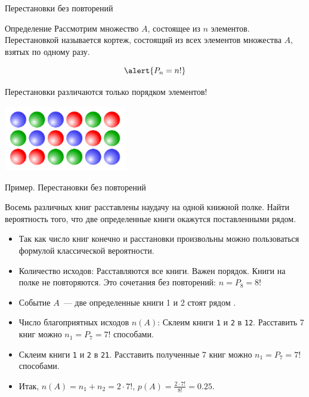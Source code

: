 \documentclass[unicode,11pt,notheorems,xcolor=table]{beamer}
\begin{document}
\begin{frame}{Перестановки без повторений} 

    \begin{block}{Определение}
        Рассмотрим множество $A$, состоящее из $n$ элементов.
        \alert{Перестановкой} называется кортеж, состоящий из всех элементов  множества $A$, взятых по одному разу.
    \end{block}
    $$
        \alert{P_n = n!}
    $$

    Перестановки различаются только порядком элементов!

    \bigskip
    {\centering\includegraphics[width=0.4\textwidth]{permutations.png}\par}

\end{frame}
\begin{frame}{Пример. Перестановки без повторений}
    \begin{exampleblock}{}
        Восемь различных книг расставлены наудачу на одной книжной полке. Найти вероятность того, что две определенные книги окажутся поставленными рядом.    
    \end{exampleblock}
    \begin{itemize}
        \item Так как число книг конечно и расстановки произвольны можно пользоваться формулой классической вероятности. 
        
        \item Количество исходов: Расставляются все книги. Важен порядок. Книги на полке не повторяются. Это сочетания без повторений:
        $n=P_8=8!$
        \item Событие $A$~--- две определенные книги 1 и 2 стоят рядом .
        \item 
        Число благоприятных исходов $n(A)$: Склеим книги \texttt{1} и \texttt{2} в \texttt{12}. Расставить 7 книг можно $n_1=P_7=7!$ способами.  
        \item Склеим книги \texttt{1} и \texttt{2} в \texttt{21}. Расставить полученные 7 книг можно $n_1=P_7=7!$ способами.  
        \item Итак,  $n(A)=n_1+n_2=2\cdot 7!$, \hfill \alert{$p(A)=\frac{2\cdot 7!}{8!}=0.25$.}
    \end{itemize}
\end{frame}
\end{document}
